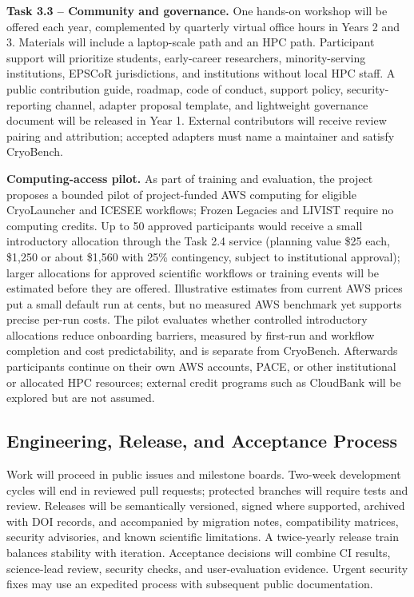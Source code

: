 \textbf{Task 3.3 -- Community and governance.} One hands-on workshop will be
offered each year, complemented by quarterly virtual office hours in Years 2
and 3. Materials will include a laptop-scale path and an HPC path. Participant
support will prioritize students, early-career researchers, minority-serving
institutions, EPSCoR jurisdictions, and institutions without local HPC staff.
A public contribution guide, roadmap, code of conduct, support policy,
security-reporting channel, adapter proposal template, and lightweight
governance document will be released in Year 1. External contributors will
receive review pairing and attribution; accepted adapters must name a
maintainer and satisfy CryoBench.

\textbf{Computing-access pilot.} As part of training and evaluation, the
project proposes a bounded pilot of project-funded AWS computing for eligible
CryoLauncher and ICESEE workflows; Frozen Legacies and LIVIST require no
computing credits. Up to 50 approved participants would receive a small
introductory allocation through the Task 2.4 service (planning value \$25
each, \$1,250 or about \$1,560 with 25\% contingency, subject to institutional
approval); larger allocations for approved scientific workflows or training
events will be estimated before they are offered. Illustrative estimates from current AWS prices put a small
default run at cents, but no measured AWS benchmark yet supports precise
per-run costs. The pilot evaluates whether controlled introductory allocations reduce
onboarding barriers, measured by first-run and workflow completion and cost
predictability, and is separate from CryoBench.
Afterwards participants continue on their own AWS accounts, PACE, or other
institutional or allocated HPC resources; external credit programs such as
CloudBank will be explored but are not assumed.

\subsection{Engineering, Release, and Acceptance Process}

Work will proceed in public issues and milestone boards. Two-week development
cycles will end in reviewed pull requests; protected branches will require
tests and review. Releases will be semantically versioned, signed where
supported, archived with DOI records, and accompanied by migration notes,
compatibility matrices, security advisories, and known scientific
limitations. A twice-yearly release train balances stability with iteration.
Acceptance decisions will combine CI results, science-lead review, security
checks, and user-evaluation evidence. Urgent security fixes may use an
expedited process with subsequent public documentation.

